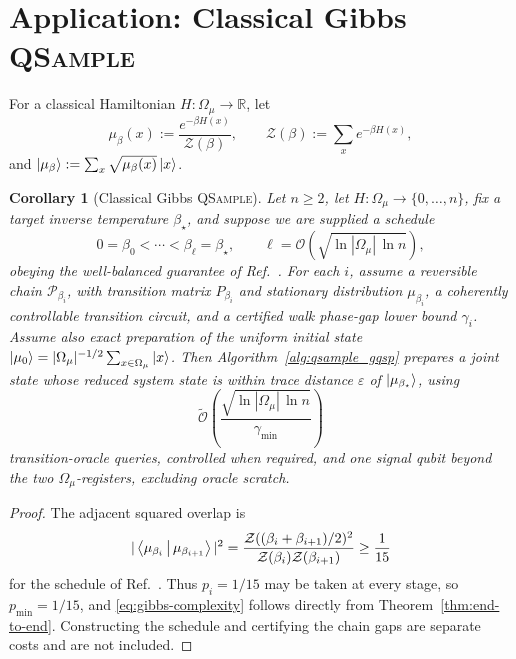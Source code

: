 \documentclass[10pt,conference]{IEEEtran}
\theoremstyle{plain}
\newtheorem{corollary}[theorem]{Corollary}
\theoremstyle{remark}
\renewcommand{\braket}[2]{\Braket{#1 | #2}}
\begin{document}

\section{Application: Classical Gibbs \textsc{QSample}}
\label{sec:application}

For a classical Hamiltonian \(H:\Omega_\mu\to\mathbb R\), let
\begin{equation}
\mu_\beta(x):=\frac{e^{-\beta H(x)}}{\mathcal Z(\beta)},
\qquad
\mathcal Z(\beta):=\sum_xe^{-\beta H(x)},
\label{eq:gibbs-distribution-general}
\end{equation}
and
\(\ket{\mu_\beta}:=\sum_x\sqrt{\mu_\beta(x)}\ket{x}\).

\begin{corollary}[Classical Gibbs \textsc{QSample}]
\label{cor:gibbs-qsampling}
Let \(n\geq2\), let \(H:\Omega_\mu\to\{0,\ldots,n\}\), fix a target inverse
temperature \(\beta_\star\), and suppose we are supplied a schedule
\[
0=\beta_0<\cdots<\beta_\ell=\beta_\star,\qquad
\ell=\mathcal O\!\left(
\sqrt{\ln|\Omega_\mu|\,\ln n}\right),
\]
obeying the well-balanced guarantee of
Ref.~\cite{Arunachalam_2022}.  For each \(i\), assume a reversible
chain \(\mathcal P_{\beta_i}\), with transition matrix \(P_{\beta_i}\)
and stationary distribution \(\mu_{\beta_i}\),
a coherently controllable transition circuit, and a certified walk
phase-gap lower bound \(\gamma_i\).  Assume also exact preparation of
the uniform initial state
\(\ket{\mu_0}=|\Omega_\mu|^{-1/2}\sum_{x\in\Omega_\mu}\ket{x}\).
Then Algorithm~\ref{alg:qsample_gqsp} prepares a joint state whose
reduced system state is
within trace distance \(\varepsilon\) of
\(\ket{\mu_{\beta_\star}}\), using
\begin{equation}
\widetilde{\mathcal O}\!\left(
\frac{\sqrt{\ln|\Omega_\mu|\,\ln n}}{\gamma_{\min}}\right)
\label{eq:gibbs-complexity}
\end{equation}
transition-oracle queries, controlled when required, and one signal
qubit beyond the two \(\Omega_\mu\)-registers, excluding oracle scratch.
\end{corollary}
\begin{proof}
The adjacent squared overlap is
\[
|\braket{\mu_{\beta_i}}{\mu_{\beta_{i+1}}}|^2
=
\frac{\mathcal Z((\beta_i+\beta_{i+1})/2)^2}
{\mathcal Z(\beta_i)\mathcal Z(\beta_{i+1})}
\geq\frac1{15}
\]
for the schedule of Ref.~\cite{Arunachalam_2022}.  Thus
\(p_i=1/15\) may be taken at every stage, so \(p_{\min}=1/15\), and
\eqref{eq:gibbs-complexity} follows directly
from Theorem~\ref{thm:end-to-end}.  Constructing the schedule and
certifying the chain gaps are separate costs and are not included.
\end{proof}
\end{document}
